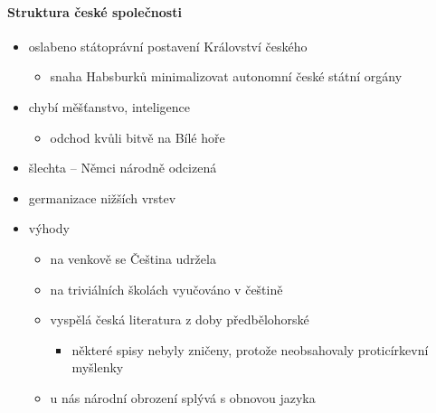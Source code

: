 \paragraph{Struktura české společnosti}
\begin{itemize}
\item oslabeno státoprávní postavení Království českého
	\begin{itemize}
	\item snaha Habsburků minimalizovat autonomní české státní orgány
	\end{itemize}
\item chybí měšťanstvo, inteligence
	\begin{itemize}
	\item odchod kvůli bitvě na Bílé hoře
	\end{itemize}
\item šlechta -- Němci \ra národně odcizená

\item germanizace nižších vrstev
\item výhody
	\begin{itemize}
	\item na venkově se Čeština udržela
	\item na triviálních školách vyučováno v češtině
	\item vyspělá česká literatura z doby předbělohorské 
		\begin{itemize}
		\item některé spisy nebyly zničeny, protože neobsahovaly proticírkevní myšlenky
		\end{itemize}
	\item u nás národní obrození splývá s obnovou jazyka
	\end{itemize}
\end{itemize}

